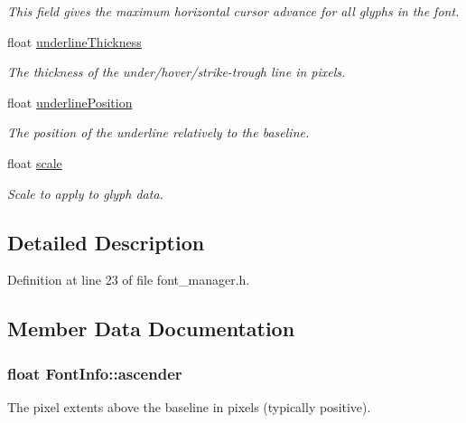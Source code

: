 \begin{DoxyCompactItemize}
\begin{DoxyCompactList}\small\item\em This field gives the maximum horizontal cursor advance for all glyphs in the font. \end{DoxyCompactList}\item 
float \hyperlink{struct_font_info_a0657ed0e246772231bb768cae16d4f08}{underline\+Thickness}
\begin{DoxyCompactList}\small\item\em The thickness of the under/hover/strike-\/trough line in pixels. \end{DoxyCompactList}\item 
float \hyperlink{struct_font_info_a7e89e9a15aca664a36a63e1222838777}{underline\+Position}
\begin{DoxyCompactList}\small\item\em The position of the underline relatively to the baseline. \end{DoxyCompactList}\item 
float \hyperlink{struct_font_info_ad14ef24faacbdb52fc598ebe1deedfa1}{scale}
\begin{DoxyCompactList}\small\item\em Scale to apply to glyph data. \end{DoxyCompactList}\end{DoxyCompactItemize}


\subsection{Detailed Description}


Definition at line 23 of file font\+\_\+manager.\+h.



\subsection{Member Data Documentation}
\hypertarget{struct_font_info_a6425ef6a67acb7b423d630576d22241e}{
\subsubsection[{ascender}]{\setlength{\rightskip}{0pt plus 5cm}float Font\+Info\+::ascender}}\label{struct_font_info_a6425ef6a67acb7b423d630576d22241e}


The pixel extents above the baseline in pixels (typically positive). 



